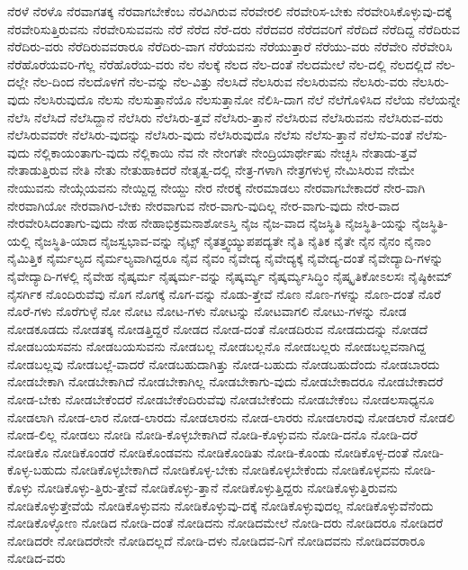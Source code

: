{ನೆರಳೆ
ನೆರಳೊ
ನೆರವಾಗತಕ್ಕ
ನೆರವಾಗಬೇಕೆಂಬ
ನೆರವಿಗಿರುವ
ನೆರವೇರಲಿ
ನೆರವೇರಿಸ-ಬೇಕು
ನೆರವೇರಿಸಿಕೊಳ್ಳುವು-ದಕ್ಕೆ
ನೆರವೇರಿಸುತ್ತಿರುವನು
ನೆರವೇರಿಸುವವನು
ನೆರೆ
ನೆರೆದ
ನೆರೆ-ದರು
ನೆರೆದವರ
ನೆರೆದವರಿಗೆ
ನೆರೆದಿದೆ
ನೆರೆದಿದ್ದ
ನೆರೆದಿರುವ
ನೆರೆದಿರು-ವರು
ನೆರೆದಿರುವವರಾರೂ
ನೆರೆದಿರು-ವಾಗ
ನೆರೆಯವನು
ನೆರೆಯುತ್ತಾರೆ
ನೆರೆಯು-ವರು
ನೆರೆವೇರಿ
ನೆರೆವೇರಿಸಿ
ನೆರೆಹೊರೆಯವರಿ-ಗೆಲ್ಲ
ನೆರೆಹೊರೆಯ-ವರು
ನೆಲ
ನೆಲಕ್ಕೆ
ನೆಲದ
ನೆಲ-ದಂತೆ
ನೆಲದಮೇಲೆ
ನೆಲ-ದಲ್ಲಿ
ನೆಲದಲ್ಲಿದೆ
ನೆಲ-ದಲ್ಲೇ
ನೆಲ-ದಿಂದ
ನೆಲದೊಳಗೆ
ನೆಲ-ವನ್ನು
ನೆಲ-ವಿತ್ತು
ನೆಲಸಿದೆ
ನೆಲಸಿರುವ
ನೆಲಸಿರುವನು
ನೆಲಸಿರು-ವರು
ನೆಲಸಿರು-ವುದು
ನೆಲಸಿರುವುದೊ
ನೆಲಸು
ನೆಲಸುತ್ತಾನೆಯೊ
ನೆಲಸುತ್ತಾನೋ
ನೆಲಿಸಿ-ದಾಗ
ನೆಲೆ
ನೆಲೆಗೊಳಿಸಿದ
ನೆಲೆಯ
ನೆಲೆಯನ್ನೇ
ನೆಲೆಸಿ
ನೆಲೆಸಿದೆ
ನೆಲೆಸಿದ್ದಾನೆ
ನೆಲೆಸಿರು
ನೆಲೆಸಿರು-ತ್ತವೆ
ನೆಲೆಸಿರು-ತ್ತಾನೆ
ನೆಲೆಸಿರುವ
ನೆಲೆಸಿರುವನು
ನೆಲೆಸಿರುವ-ವರು
ನೆಲೆಸಿರುವವರೇ
ನೆಲೆಸಿರು-ವುದನ್ನು
ನೆಲೆಸಿರು-ವುದು
ನೆಲೆಸಿರುವುದೊ
ನೆಲೆಸು
ನೆಲೆಸು-ತ್ತಾನೆ
ನೆಲೆಸು-ವಂತೆ
ನೆಲೆಸು-ವುದು
ನೆಲ್ಲಿಕಾಯಂತಾಗು-ವುದು
ನೆಲ್ಲಿಕಾಯಿ
ನೆವ
ನೇ
ನೇಂಗತೇ
ನೇಂದ್ರಿಯಾರ್ಥೇಷು
ನೇಚ್ಛಸಿ
ನೇತಾಡು-ತ್ತವೆ
ನೇತಾಡುತ್ತಿರುವ
ನೇತಿ
ನೇತು
ನೇತುಹಾಕಿದರೆ
ನೇತೃತ್ವ-ದಲ್ಲಿ
ನೇತ್ರ-ಗಳಾಗಿ
ನೇತ್ರಗಳುಳ್ಳ
ನೇಮಿಸಿರುವ
ನೇಮೇ
ನೇಯುವನು
ನೇಯ್ಗೆಯವನು
ನೇಯ್ದಿದ್ದ
ನೇಯ್ದು
ನೇರ
ನೇರಕ್ಕೆ
ನೇರಮಾಡಲು
ನೇರವಾಗಬೇಕಾದರೆ
ನೇರ-ವಾಗಿ
ನೇರವಾಗಿಯೋ
ನೇರವಾಗಿರ-ಬೇಕು
ನೇರವಾಗುವ
ನೇರ-ವಾಗು-ವುದಿಲ್ಲ
ನೇರ-ವಾಗು-ವುದು
ನೇರ-ವಾದ
ನೇರವೇರಿಸಿದಂತಾಗು-ವುದು
ನೇಹ
ನೇಹಾಭಿಕ್ರಮನಾಶೋಽಸ್ತಿ
ನೈಜ
ನೈಜ-ವಾದ
ನೈಜಸ್ಥಿತಿ
ನೈಜಸ್ಥಿತಿ-ಯನ್ನು
ನೈಜಸ್ಥಿತಿ-ಯಲ್ಲಿ
ನೈಜಸ್ಥಿತಿ-ಯಾದ
ನೈಜಸ್ವಭಾವ-ವನ್ನು
ನೈಟ್ಸ್
ನೈತತ್ತ್ವಯ್ಯುಪಪದ್ಯತೇ
ನೈತಿ
ನೈತಿಕ
ನೈತೇ
ನೈನ
ನೈನಂ
ನೈನಾಂ
ನೈಮಿತ್ತಿಕ
ನೈರ್ಮಲ್ಯದ
ನೈರ್ಮಲ್ಯವಾಗಿದ್ದರೂ
ನೈವ
ನೈವಂ
ನೈವೇದ್ಯ
ನೈವೇದ್ಯಕ್ಕೆ
ನೈವೇದ್ಯ-ದಂತೆ
ನೈವೇದ್ಯಾದಿ-ಗಳನ್ನು
ನೈವೇದ್ಯಾದಿ-ಗಳಲ್ಲಿ
ನೈವೇಹ
ನೈಷ್ಕರ್ಮ
ನೈಷ್ಕರ್ಮ-ವನ್ನು
ನೈಷ್ಕರ್ಮ್ಯ
ನೈಷ್ಕರ್ಮ್ಯಸಿದ್ಧಿಂ
ನೈಷ್ಕೃತಿಕೋಽಲಸಃ
ನೈಷ್ಠಿಕೀಮ್
ನೈಸರ್ಗಿಕ
ನೊಂದಿರುವೆವು
ನೊಗ
ನೊಗಕ್ಕೆ
ನೊಗ-ವನ್ನು
ನೊಡು-ತ್ತೇವೆ
ನೊಣ
ನೊಣ-ಗಳನ್ನು
ನೊಣ-ದಂತೆ
ನೊರೆ
ನೊರೆ-ಗಳು
ನೊರೆಗುಳ್ಳೆ
ನೋ
ನೋಟ
ನೋಟ-ಗಳು
ನೋಟನ್ನು
ನೋಟವಾಗಲಿ
ನೋಟು-ಗಳನ್ನು
ನೋಡ
ನೋಡಕೂಡದು
ನೋಡತಕ್ಕ
ನೋಡತ್ತಿದ್ದರೆ
ನೋಡದ
ನೋಡ-ದಂತೆ
ನೋಡದಿರುವ
ನೋಡದುದನ್ನು
ನೋಡದೆ
ನೋಡಬಯಸವನು
ನೋಡಬಯಸುವನು
ನೋಡಬಲ್ಲ
ನೋಡಬಲ್ಲನೊ
ನೋಡಬಲ್ಲರು
ನೋಡಬಲ್ಲವನಾಗಿದ್ದ
ನೋಡಬಲ್ಲವು
ನೋಡಬಲ್ಲೆ-ವಾದರೆ
ನೋಡಬಹುದಾಗಿತ್ತು
ನೋಡ-ಬಹುದು
ನೋಡಬಹುದೆಂದು
ನೋಡಬಾರದು
ನೋಡಬೇಕಾಗಿ
ನೋಡಬೇಕಾಗಿದೆ
ನೋಡಬೇಕಾಗಿಲ್ಲ
ನೋಡಬೇಕಾಗು-ವುದು
ನೋಡಬೇಕಾದರೂ
ನೋಡಬೇಕಾದರೆ
ನೋಡ-ಬೇಕು
ನೋಡಬೇಕೆಂದರೆ
ನೋಡಬೇಕೆಂದಿರುವೆವು
ನೋಡಬೇಕೆಂದು
ನೋಡಬೇಕೆಂಬ
ನೋಡಲಸಾಧ್ಯನೂ
ನೋಡಲಾಗಿ
ನೋಡ-ಲಾರ
ನೋಡ-ಲಾರದು
ನೋಡಲಾರನು
ನೋಡ-ಲಾರರು
ನೋಡಲಾರವು
ನೋಡಲಾರೆ
ನೋಡಲಿ
ನೋಡ-ಲಿಲ್ಲ
ನೋಡಲು
ನೋಡಿ
ನೋಡಿ-ಕೊಳ್ಳಬೇಕಾಗಿದೆ
ನೋಡಿ-ಕೊಳ್ಳುವನು
ನೋಡಿ-ದನೊ
ನೋಡಿ-ದರೆ
ನೋಡಿಕೊ
ನೋಡಿಕೊಂಡರೆ
ನೋಡಿಕೊಂಡವನು
ನೋಡಿಕೊಂಡಿತು
ನೋಡಿ-ಕೊಂಡು
ನೋಡಿಕೊಳ್ಳ-ದಂತೆ
ನೋಡಿ-ಕೊಳ್ಳ-ಬಹುದು
ನೋಡಿಕೊಳ್ಳಬೇಕಾಗಿದೆ
ನೋಡಿಕೊಳ್ಳ-ಬೇಕು
ನೋಡಿಕೊಳ್ಳಬೇಕೆಂದು
ನೋಡಿಕೊಳ್ಳವನು
ನೋಡಿ-ಕೊಳ್ಳು
ನೋಡಿಕೊಳ್ಳು-ತ್ತಿರು-ತ್ತೇವೆ
ನೋಡಿಕೊಳ್ಳು-ತ್ತಾನೆ
ನೋಡಿಕೊಳ್ಳುತ್ತಿದ್ದರು
ನೋಡಿಕೊಳ್ಳುತ್ತಿರುವನು
ನೋಡಿಕೊಳ್ಳುತ್ತೇವೆಯೆ
ನೋಡಿಕೊಳ್ಳುವನು
ನೋಡಿಕೊಳ್ಳುವು-ದಕ್ಕೆ
ನೋಡಿಕೊಳ್ಳುವುದಲ್ಲ
ನೋಡಿಕೊಳ್ಳುವೆನೆಂದು
ನೋಡಿಕೊಳ್ಳೋಣ
ನೋಡಿದ
ನೋಡಿ-ದಂತೆ
ನೋಡಿದನು
ನೋಡಿದಮೇಲೆ
ನೋಡಿ-ದರು
ನೋಡಿದರೂ
ನೋಡಿದರೆ
ನೋಡಿದರೇ
ನೋಡಿದರೇನೇ
ನೋಡಿದಲ್ಲದೆ
ನೋಡಿ-ದಳು
ನೋಡಿದವ-ನಿಗೆ
ನೋಡಿದವನು
ನೋಡಿದವರಾರೂ
ನೋಡಿದ-ವರು
}
